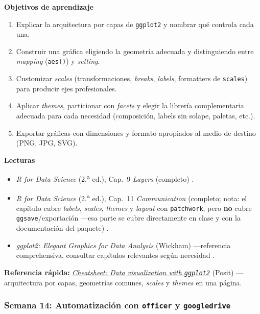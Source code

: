 \documentclass[11pt,letterpaper]{article}
\newcommand{\semana}[2]{%
  \subsubsection*{\color{main}Semana #1: #2}%
}
\newcommand{\cheatsheet}[2]{%
  \href{https://rstudio.github.io/cheatsheets/#1.pdf}{\textit{Cheatsheet: #2}}%
}
\begin{document}
\medskip
\noindent\textbf{Objetivos de aprendizaje}
\begin{enumerate}[leftmargin=*, itemsep=1pt]
    \item Explicar la arquitectura por capas de \texttt{ggplot2} y nombrar qué controla cada una.
    \item Construir una gráfica eligiendo la geometría adecuada y distinguiendo entre \textit{mapping} (\texttt{aes()}) y \textit{setting}.
    \item Customizar \textit{scales} (transformaciones, \textit{breaks}, \textit{labels}, formatters de \texttt{scales}) para producir ejes profesionales.
    \item Aplicar \textit{themes}, particionar con \textit{facets} y elegir la librería complementaria adecuada para cada necesidad (composición, labels sin solape, paletas, etc.).
    \item Exportar gráficas con dimensiones y formato apropiados al medio de destino (PNG, JPG, SVG).
\end{enumerate}

\medskip
\noindent\textbf{Lecturas}
\begin{itemize}[leftmargin=*, itemsep=1pt]
    \item \textit{R for Data Science} (2.\textsuperscript{a} ed.), Cap.\ 9 \textit{Layers} (completo) \cite{wickham2023r4ds}.
    \item \textit{R for Data Science} (2.\textsuperscript{a} ed.), Cap.\ 11 \textit{Communication} (completo; nota: el capítulo cubre \textit{labels}, \textit{scales}, \textit{themes} y \textit{layout} con \texttt{patchwork}, pero \textbf{no} cubre \texttt{ggsave}/exportación ---esa parte se cubre directamente en clase y con la documentación del paquete) \cite{wickham2023r4ds}.
    \item \textit{ggplot2: Elegant Graphics for Data Analysis} (Wickham) ---referencia comprehensiva, consultar capítulos relevantes según necesidad \cite{wickham2016ggplot2}.
\end{itemize}

\medskip
\noindent\textbf{Referencia rápida:} \cheatsheet{data-visualization}{Data visualization with \texttt{ggplot2}} (Posit) ---arquitectura por capas, geometrías comunes, \textit{scales} y \textit{themes} en una página.

\semana{14}{Automatización con \texttt{officer} y \texttt{googledrive}}
\end{document}
